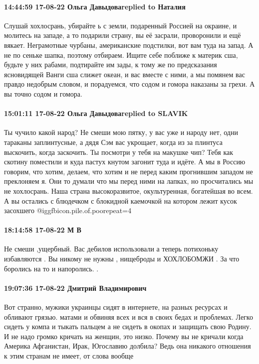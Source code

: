 \paragraph{14:44:59 17-08-22 Ольга Давыдоваreplied to Наталия}

Слушай хохлосрань, убирайте ь с земли, подаренный Россией на окраине, и
молитесь на западе, а то подарили страну, вы её засрали, проворонили и ещё
вякает. Неграмотные чурбаны, американские подстилки, вот вам туда на запад. А
не по сеньке шапка, поэтому отбираем. Ищите себе поближе к материк сша, будьте
у них рабами, подтирайте им зады, к тому же по предсказания ясновидящей Ванги
сша слижет океан, и вас вместе с ними, а мы помянем вас правдо недобрым словом,
и порадуемся, что содом и гомора наказаны за грехи. А вы точно содом и гомора.

\paragraph{15:01:11 17-08-22 Ольга Давыдоваreplied to SLAVIK}

Ты чучило какой народ? Не смеши мою пятку, у вас уже и народу нет, одни
тараканы заплинтусные, а дядя Сэм вас укрощает, когда из за плинтуса выскочить,
когда заскочить. Ты посмотри у тебя на макушке чип? Тебя как скотину поместили
и куда пастух кнутом загонит туда и идёте. А мы в Россию говорим, что хотим,
делаем, что хотим и не перед каким прогнившим западом не преклоняем я. Они то
думали что мы перед ними на лапках, но просчитались мы не хохлосрань. Наша
страна высокоразвитое, окультуренная, богатейшая во всем. А вы остались с
блюдечком с блокидной каемочкой на котором лежит кусок засохшего  @igg{fbicon.pile.of.poo}{repeat=4} 

\paragraph{18:14:58 17-08-22 М В}

Не смеши ,ущербный. Вас дебилов использовали а теперь потихоньку избавляются .
Вы никому не нужны , нищеброды и ХОХЛОБОМЖИ . За что боролись на то и
напоролись. .

\paragraph{19:07:36 17-08-22 Дмитрий Владимирович}

Вот странно, мужики украинцы сидят в интернете, на разных ресурсах и обливают
грязью. матами и обвиняя всех и вся в своих бедах и проблемах. Легко сидеть у
компа и тыкать пальцем а не сидеть в окопах и защищать свою Родину. И не надо
громко кричать на женщин, это низко. Почему вы не кричали когда Америка
Афганистан, Ирак, Югославию долбила? Ведь она никакого отношения к этим странам
не имеет, от слова вообще

